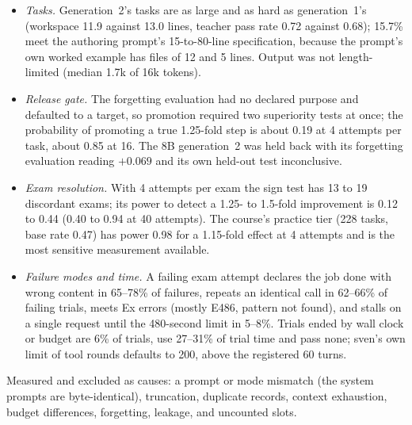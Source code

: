 \begin{itemize}
  completion tokens per exam trial fell from about 1530 to about 1000. Repeated identical calls (same call, same result) are
  42\% of the champion's exam calls and 62\% of generation~2's; 5.3\% of the champion's supervised calls carry sven's repeat
  note (teacher 0.6\%).
\item \emph{Tasks.} Generation~2's tasks are as large and as hard as generation~1's (workspace 11.9 against 13.0 lines, teacher
  pass rate 0.72 against 0.68); 15.7\% meet the authoring prompt's 15-to-80-line specification, because the prompt's own
  worked example has files of 12 and 5 lines. Output was not length-limited (median 1.7k of 16k tokens).
\item \emph{Release gate.} The forgetting evaluation had no declared purpose and defaulted to a target, so promotion required
  two superiority tests at once; the probability of promoting a true 1.25-fold step is about 0.19 at 4 attempts per task,
  about 0.85 at 16. The 8B generation~2 was held back with its forgetting evaluation reading $+0.069$ and its own held-out test
  inconclusive.
\item \emph{Exam resolution.} With 4 attempts per exam the sign test has 13 to 19 discordant exams; its power to detect a
  1.25- to 1.5-fold improvement is 0.12 to 0.44 (0.40 to 0.94 at 40 attempts). The course's practice tier (228 tasks, base
  rate 0.47) has power 0.98 for a 1.15-fold effect at 4 attempts and is the most sensitive measurement available.
\item \emph{Failure modes and time.} A failing exam attempt declares the job done with wrong content in 65--78\% of failures,
  repeats an identical call in 62--66\% of failing trials, meets Ex errors (mostly E486, pattern not found), and stalls on a
  single request until the 480-second limit in 5--8\%. Trials ended by wall clock or budget are 6\% of trials, use 27--31\% of
  trial time and pass none; sven's own limit of tool rounds defaults to 200, above the registered 60 turns.
\end{itemize}
Measured and excluded as causes: a prompt or mode mismatch (the system prompts are byte-identical), truncation, duplicate
records, context exhaustion, budget differences, forgetting, leakage, and uncounted slots.

